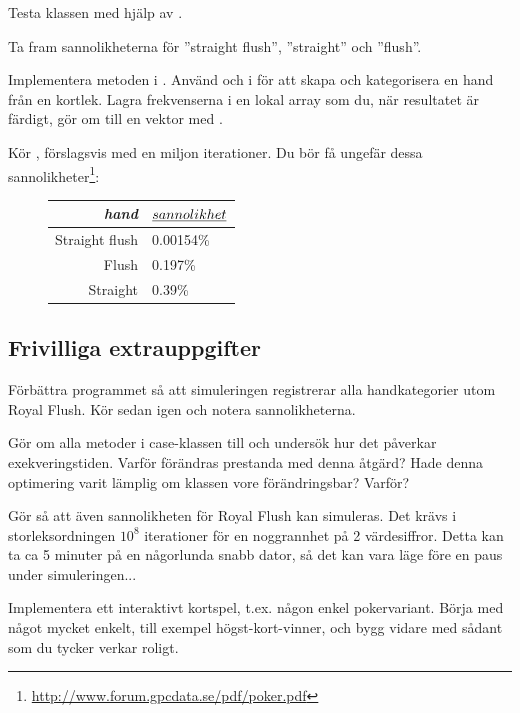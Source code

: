 \Subtask Testa klassen  med hjälp av .


\Task Ta fram sannolikheterna för ''straight flush'', ''straight'' och ''flush''.

\Subtask Implementera metoden  i . Använd  och  i  för att skapa och kategorisera en hand från en kortlek. Lagra frekvenserna i en lokal array som du, när resultatet är färdigt, gör om till en vektor med .

\Subtask Kör , förslagsvis med en miljon iterationer. Du bör få ungefär dessa sannolikheter\footnote{\url{http://www.forum.gpcdata.se/pdf/poker.pdf}}:
\begin{figure}[H]\centering
\begin{tabular}{r|l}
\emph{hand} & $\emph{sannolikhet}$ \\ \hline
Straight flush & 0.00154\%  \\
Flush          & 0.197\%    \\
Straight       & 0.39\%     \\
\end{tabular}
\end{figure}


\subsection{Frivilliga extrauppgifter}


\Task Förbättra programmet så att simuleringen registrerar alla handkategorier utom Royal Flush. Kör sedan  igen och notera sannolikheterna.

\Task Gör om alla metoder i case-klassen  till  och undersök hur det påverkar exekveringstiden. Varför förändras prestanda med denna åtgärd? Hade denna optimering varit lämplig om klassen  vore förändringsbar? Varför?

\Task Gör så att även sannolikheten för Royal Flush kan simuleras. Det krävs i storleksordningen $10^8$ iterationer för en noggrannhet på 2 värdesiffror. Detta kan ta ca 5 minuter på en någorlunda snabb dator, så det kan vara läge före en paus under simuleringen...

\Task Implementera ett interaktivt kortspel, t.ex. någon enkel pokervariant. Börja med något mycket enkelt, till exempel högst-kort-vinner, och bygg vidare med sådant som du tycker verkar roligt.

